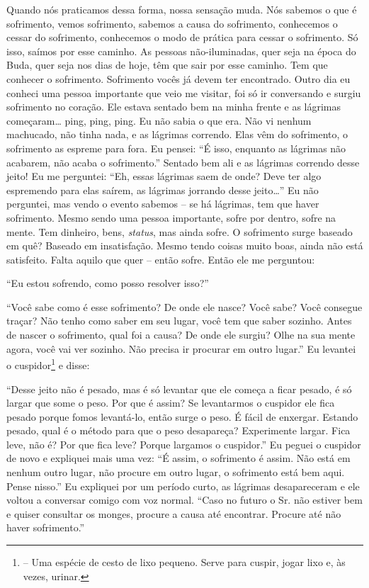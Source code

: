 Quando nós praticamos dessa forma, nossa sensação muda. Nós sabemos
o que é sofrimento, vemos sofrimento, sabemos a causa do sofrimento,
conhecemos o cessar do sofrimento, conhecemos o modo de prática para
cessar o sofrimento. Só isso, saímos por esse caminho. As pessoas
não-iluminadas, quer seja na época do Buda, quer seja nos dias de hoje,
têm que sair por esse caminho. Tem que conhecer o sofrimento.
Sofrimento vocês já devem ter encontrado. Outro dia eu conheci uma
pessoa importante que veio me visitar, foi só ir conversando e surgiu
sofrimento no coração. Ele estava sentado bem na minha frente e as
lágrimas começaram\ldots{} ping, ping, ping. Eu não sabia o que era. Não vi
nenhum machucado, não tinha nada, e as lágrimas correndo. Elas vêm do
sofrimento, o sofrimento as espreme para fora. Eu pensei: “É isso,
enquanto as lágrimas não acabarem, não acaba o sofrimento.” Sentado bem
ali e as lágrimas correndo desse jeito! Eu me perguntei: “Eh, essas
lágrimas saem de onde? Deve ter algo espremendo para elas saírem, as
lágrimas jorrando desse jeito\ldots{}” Eu não perguntei, mas vendo o evento
sabemos – se há lágrimas, tem que haver sofrimento.
Mesmo sendo uma pessoa importante, sofre por dentro, sofre na mente.
Tem dinheiro, bens, \textit{status}, mas ainda sofre. O sofrimento
surge baseado em quê? Baseado em insatisfação. Mesmo tendo coisas muito
boas, ainda não está satisfeito. Falta aquilo que quer
– então sofre. Então ele me perguntou: 

“Eu estou sofrendo, como posso resolver isso?” 

“Você sabe como é esse sofrimento? De onde ele nasce? Você sabe?
Você consegue traçar? Não tenho como saber em seu lugar, você tem que
saber sozinho. Antes de nascer o sofrimento, qual foi a causa? De onde
ele surgiu? Olhe na sua mente agora, você vai ver sozinho. Não precisa
ir procurar em outro lugar.” Eu levantei o
cuspidor\footnote{ – Uma espécie de
cesto de lixo pequeno. Serve para cuspir, jogar lixo e, às vezes,
urinar.} e disse: 

“Desse jeito não é pesado, mas é só levantar que ele começa a ficar
pesado, é só largar que some o peso. Por que é assim? Se levantarmos o
cuspidor ele fica pesado porque fomos levantá-lo, então surge o peso. É
fácil de enxergar. Estando pesado, qual é o método para que o peso
desapareça? Experimente largar. Fica leve, não é? Por que fica leve?
Porque largamos o cuspidor.” Eu peguei o cuspidor de novo e expliquei
mais uma vez: “É assim, o sofrimento é assim. Não está em nenhum outro
lugar, não procure em outro lugar, o sofrimento está bem aqui. Pense
nisso.” Eu expliquei por um período curto, as lágrimas desapareceram e
ele voltou a conversar comigo com voz normal. “Caso no futuro o Sr. não
estiver bem e quiser consultar os monges, procure a causa até
encontrar. Procure até não haver sofrimento.”

